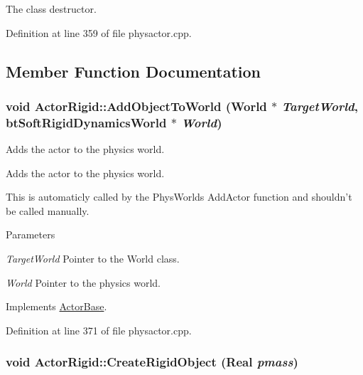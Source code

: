 The class destructor. 

Definition at line 359 of file physactor.cpp.



\subsection{Member Function Documentation}
\hypertarget{classActorRigid_a2dc29c81eae90d3344fda0a80f066448}{
\subsubsection[{AddObjectToWorld}]{\setlength{\rightskip}{0pt plus 5cm}void ActorRigid::AddObjectToWorld ({\bf World} $\ast$ {\em TargetWorld}, \/  btSoftRigidDynamicsWorld $\ast$ {\em World})}}
\label{d5/d10/classActorRigid_a2dc29c81eae90d3344fda0a80f066448}


Adds the actor to the physics world. 

Adds the actor to the physics world. \par
 This is automaticly called by the PhysWorlds AddActor function and shouldn't be called manually. 
\begin{DoxyParams}{Parameters}
\item[{\em TargetWorld}]Pointer to the World class. \item[{\em World}]Pointer to the physics world. \end{DoxyParams}


Implements \hyperlink{classActorBase_a8c5401ae316ad2fbc1279016cef4c9f6}{ActorBase}.



Definition at line 371 of file physactor.cpp.

\hypertarget{classActorRigid_a57d5fe315a120e97bf34e1930a7678d8}{
\subsubsection[{CreateRigidObject}]{\setlength{\rightskip}{0pt plus 5cm}void ActorRigid::CreateRigidObject (Real {\em pmass})}}
\label{d5/d10/classActorRigid_a57d5fe315a120e97bf34e1930a7678d8}


